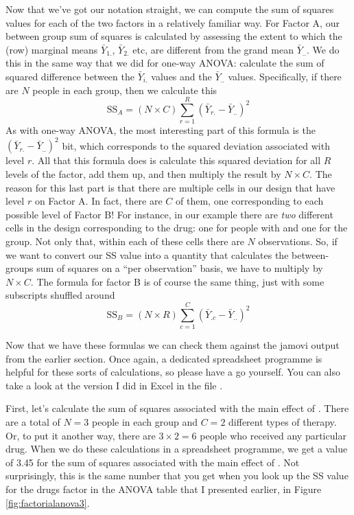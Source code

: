 \vspace{0.5cm}
\begin{mdframed}[style=MyFrame,nobreak=false]
Now that we've got our notation straight, we can compute the sum of squares values for each of the two factors in a relatively familiar way. For Factor A, our between group sum of squares is calculated by assessing the extent to which the (row) marginal means $\bar{Y}_{1.}$, $\bar{Y}_{2.}$ etc, are different from the grand mean $\bar{Y}_{..}$. We do this in the same way that we did for one-way ANOVA: calculate the sum of squared difference between the $\bar{Y}_{i.}$ values and the $\bar{Y}_{..}$ values. Specifically, if there are $N$ people in each group, then we calculate this
$$
\mbox{SS}_{A} = (N \times C)  \sum_{r=1}^R  \left( \bar{Y}_{r.} - \bar{Y}_{..} \right)^2
$$
As with one-way ANOVA, the most interesting part of this formula is the $\left( \bar{Y}_{r.} - \bar{Y}_{..} \right)^2$ bit, which corresponds to the squared deviation associated with level $r$. All that this formula does is calculate this squared deviation for all $R$ levels of the factor, add them up, and then multiply the result by $N \times C$. The reason for this last part is that there are multiple cells in our design that have level $r$ on Factor A. In fact, there are $C$ of them, one corresponding to each possible level of Factor B! For instance, in our example there are {\it two} different cells in the design corresponding to the  drug: one for people with  and one for the  group. Not only that, within each of these cells there are $N$ observations. So, if we want to convert our SS value into a quantity that calculates the between-groups sum of squares on a ``per observation'' basis, we have to multiply by $N \times C$. The formula for factor B is of course the same thing, just with some subscripts shuffled around
$$
\mbox{SS}_{B} = (N \times R) \sum_{c=1}^C \left( \bar{Y}_{.c} - \bar{Y}_{..} \right)^2
$$

Now that we have these formulas we can check them against the jamovi output from the earlier section. Once again, a dedicated spreadsheet programme is helpful for these sorts of calculations, so please have a go yourself. You can also take a look at the version I did in Excel in the file . 

First, let's calculate the sum of squares associated with the main effect of . There are a total of $N=3$ people in each group and $C=2$ different types of therapy. Or, to put it another way, there are $3 \times 2 = 6$ people who received any particular drug. When we do these calculations in a spreadsheet programme, we get a value of 3.45 for the sum of squares associated with the main effect of . Not surprisingly, this is the same number that you get when you look up the SS value for the drugs factor in the ANOVA table that I presented earlier, in Figure \ref{fig:factorialanova3}. 


\end{mdframed}
